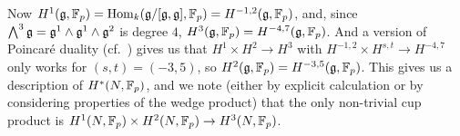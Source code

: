 Now $H^1(\mathfrak{g},\mathbb{F}_p) = \operatorname{Hom}_k(\mathfrak{g}/[\mathfrak{g},\mathfrak{g}],\mathbb{F}_p) = H^{-1,2}(\mathfrak{g},\mathbb{F}_p)$, and, since $\bigwedge^3 \mathfrak{g} = \mathfrak{g}^1 \wedge \mathfrak{g}^1 \wedge \mathfrak{g}^2$ is degree $4$, $H^3(\mathfrak{g},\mathbb{F}_p) = H^{-4,7}(\mathfrak{g},\mathbb{F}_p)$. And a version of Poincaré duality (cf.\ \cite{Fuks}) gives us that $H^1 \times H^2 \to H^3$ with $H^{-1,2} \times H^{s,t} \to H^{-4,7}$ only works for $(s,t) = (-3,5)$, so $H^2(\mathfrak{g},\mathbb{F}_p) = H^{-3,5}(\mathfrak{g},\mathbb{F}_p)$. This gives us a description of $H^*(N,\mathbb{F}_p)$, and we note (either by explicit calculation or by considering properties of the wedge product) that the only non-trivial cup product is $H^1(N,\mathbb{F}_p) \times H^2(N,\mathbb{F}_p) \to H^3(N,\mathbb{F}_p)$.



